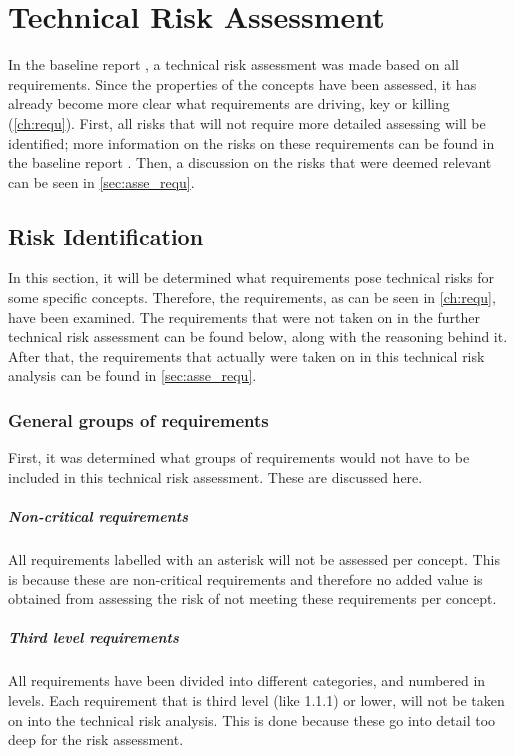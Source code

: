 \chapter{Technical Risk Assessment}
\label{ch:tech_risk_asse}

In the baseline report \cite{baseline}, a technical risk assessment was made based on all requirements. Since the properties of the concepts have been assessed, it has already become more clear what requirements are driving, key or killing (\autoref{ch:requ}). First, all risks that will not require more detailed assessing will be identified; more information on the risks on these requirements can be found in the baseline report \cite{baseline}. Then, a discussion on the risks that were deemed relevant can be seen in \autoref{sec:asse_requ}.

\section{Risk Identification}
\label{sec:risk_iden}
In this section, it will be determined what requirements pose technical risks for some specific concepts. Therefore, the requirements, as can be seen in \autoref{ch:requ}, have been examined. The requirements that were not taken on in the further technical risk assessment can be found below, along with the reasoning behind it. After that, the requirements that actually were taken on in this technical risk analysis can be found in \autoref{sec:asse_requ}.

\subsection{General groups of requirements} First, it was determined what groups of requirements would not have to be included in this technical risk assessment. These are discussed here.

\paragraph{Non-critical requirements}
All requirements labelled with an asterisk will not be assessed per concept. This is because these are non-critical requirements and therefore no added value is obtained from assessing the risk of not meeting these requirements per concept.

\paragraph{Third level requirements}
All requirements have been divided into different categories, and numbered in levels. Each requirement that is third level (like 1.1.1) or lower, will not be taken on into the technical risk analysis. This is done because these go into detail too deep for the risk assessment.

